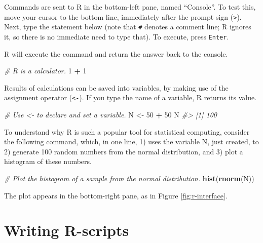 \documentclass[]{book}
\newenvironment{Shaded}{\begin{snugshade}}{\end{snugshade}}
\newcommand{\KeywordTok}[1]{\textcolor[rgb]{0.13,0.29,0.53}{\textbf{#1}}}
\newcommand{\DecValTok}[1]{\textcolor[rgb]{0.00,0.00,0.81}{#1}}
\newcommand{\StringTok}[1]{\textcolor[rgb]{0.31,0.60,0.02}{#1}}
\newcommand{\CommentTok}[1]{\textcolor[rgb]{0.56,0.35,0.01}{\textit{#1}}}
\newcommand{\OperatorTok}[1]{\textcolor[rgb]{0.81,0.36,0.00}{\textbf{#1}}}
\newcommand{\NormalTok}[1]{#1}
\begin{document}
Commands are sent to R in the bottom-left pane, named ``Console''. To
test this, move your cursor to the bottom line, immediately after the
prompt sign (\texttt{\textgreater{}}). Next, type the statement below
(note that \texttt{\#} denotes a comment line; R ignores it, so there is
no immediate need to type that). To execute, press \texttt{Enter}.

R will execute the command and return the answer back to the console.

\begin{Shaded}
\begin{Highlighting}[]
\CommentTok{# R is a calculator.}
\DecValTok{1} \OperatorTok{+}\StringTok{ }\DecValTok{1}
\end{Highlighting}
\end{Shaded}

Results of calculations can be saved into variables, by making use of
the assignment operator (\texttt{\textless{}-}). If you type the name of
a variable, R returns its value.

\begin{Shaded}
\begin{Highlighting}[]
\CommentTok{# Use <- to declare and set a variable.}
\NormalTok{N <-}\StringTok{ }\DecValTok{50} \OperatorTok{+}\StringTok{ }\DecValTok{50}
\NormalTok{N}
\CommentTok{#> [1] 100}
\end{Highlighting}
\end{Shaded}

To understand why R is such a popular tool for statistical computing,
consider the following command, which, in one line, 1) uses the variable
N, just created, to 2) generate 100 random numbers from the normal
distribution, and 3) plot a histogram of these numbers.

\begin{Shaded}
\begin{Highlighting}[]
\CommentTok{# Plot the histogram of a sample from the normal distribution.}
\KeywordTok{hist}\NormalTok{(}\KeywordTok{rnorm}\NormalTok{(N))}
\end{Highlighting}
\end{Shaded}

The plot appears in the bottom-right pane, as in Figure
\ref{fig:r-interface}.

\section{Writing R-scripts}\label{writing-r-scripts}
\end{document}
